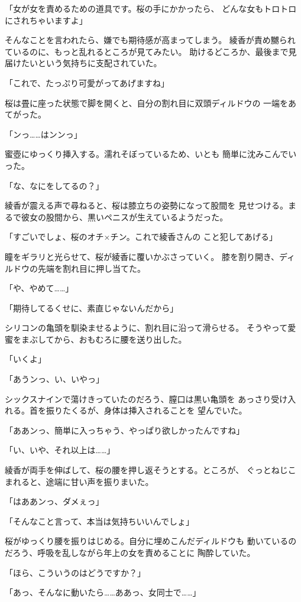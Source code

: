 ﻿\documentclass[
    book,tate,
    line_length=30zw,
    jafontsize=12pt,
    paper=b5j,
    landscape,
    ]{jlreq}
\begin{document}
「女が女を責めるための道具です。桜の手にかかったら、
どんな女もトロトロにされちゃいますよ」

そんなことを言われたら、嫌でも期待感が高まってしまう。
綾香が責め嬲られているのに、もっと乱れるところが見てみたい。
助けるどころか、最後まで見届けたいという気持ちに支配されていた。

「これで、たっぷり可愛がってあげますね」

桜は畳に座った状態で脚を開くと、自分の割れ目に双頭ディルドウの
一端をあてがった。

「ンっ……はンンっ」

蜜壺にゆっくり挿入する。濡れそぼっているため、いとも
簡単に沈みこんでいった。

「な、なにをしてるの？」

綾香が震える声で尋ねると、桜は膝立ちの姿勢になって股間を
見せつける。まるで彼女の股間から、黒いペニスが生えているようだった。

「すごいでしょ、桜のオチ×チン。これで綾香さんの
こと犯してあげる」

瞳をギラリと光らせて、桜が綾香に覆いかぶさっていく。
膝を割り開き、ディルドウの先端を割れ目に押し当てた。

「や、やめて……」

「期待してるくせに、素直じゃないんだから」

シリコンの亀頭を馴染ませるように、割れ目に沿って滑らせる。
そうやって愛蜜をまぶしてから、おもむろに腰を送り出した。

「いくよ」

「あうンっ、い、いやっ」

シックスナインで蕩けきっていたのだろう、膣口は黒い亀頭を
あっさり受け入れる。首を振りたくるが、身体は挿入されることを
望んでいた。

「ああンっ、簡単に入っちゃう、やっぱり欲しかったんですね」

「い、いや、それ以上は……」

綾香が両手を伸ばして、桜の腰を押し返そうとする。ところが、
ぐっとねじこまれると、途端に甘い声を振りまいた。

「はああンっ、ダメぇっ」

「そんなこと言って、本当は気持ちいいんでしょ」

桜がゆっくり腰を振りはじめる。自分に埋めこんだディルドウも
動いているのだろう、呼吸を乱しながら年上の女を責めることに
陶酔していた。

「ほら、こういうのはどうですか？」

「あっ、そんなに動いたら……ああっ、女同士で……」
\end{document}
